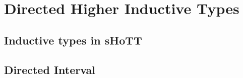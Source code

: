 \documentclass{article}
\theoremstyle{named}
\theoremstyle{remark}
\theoremstyle{definition}
\begin{document}
\section{Directed Higher Inductive Types}

\subsection*{Inductive types in sHoTT}


\subsection*{Directed Interval}

\end{document}
